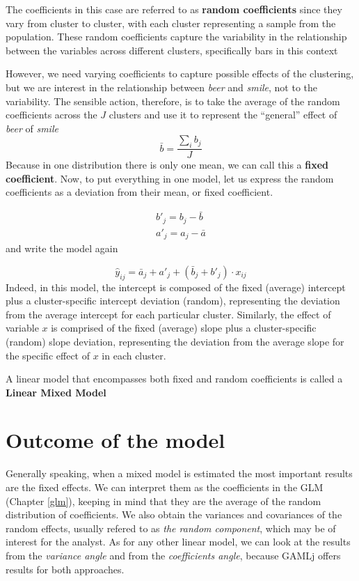 \documentclass[
]{book}
\begin{document}
The coefficients in this case are referred to as \textbf{random coefficients} since they vary from cluster to cluster, with each cluster representing a sample from the population. These random coefficients capture the variability in the relationship between the variables across different clusters, specifically bars in this context

However, we need varying coefficients to capture possible effects of the clustering, but we are interest in the relationship between \emph{beer} and \emph{smile}, not to the variability. The sensible action, therefore, is to take the average of the random coefficients across the \(J\) clusters and use it to represent the ``general'' effect of \emph{beer} of \emph{smile}
\[
\bar{b}=\frac{\sum_i{b_j}}{J} 
\]
Because in one distribution there is only one mean, we can call this a \textbf{fixed coefficient}. Now, to put everything in one model, let us express the random coefficients as a deviation from their mean, or fixed coefficient.

\[
\begin{aligned}
b'_j=b_j-\bar{b}\\ 
a'_j=a_j-\bar{a} 
\end{aligned}
\]
and write the model again

\[ 
\hat{y}_{ij}=\bar{a}_j+a'_j+ (\bar{b}_j+b'_j)  \cdot x_{ij}
\]
Indeed, in this model, the intercept is composed of the fixed (average) intercept plus a cluster-specific intercept deviation (random), representing the deviation from the average intercept for each particular cluster. Similarly, the effect of variable \(x\) is comprised of the fixed (average) slope plus a cluster-specific (random) slope deviation, representing the deviation from the average slope for the specific effect of \(x\) in each cluster.

A linear model that encompasses both fixed and random coefficients is called a \textbf{Linear Mixed Model}

\hypertarget{outcome-of-the-model}{%
\section{Outcome of the model}\label{outcome-of-the-model}}

Generally speaking, when a mixed model is estimated the most important results are the fixed effects. We can interpret them as the coefficients in the GLM (Chapter \ref{glm}), keeping in mind that they are the average of the random distribution of coefficients. We also obtain the variances and covariances of the random effects, usually refered to as \emph{the random component}, which may be of interest for the analyst. As for any other linear model, we can look at the results from the \emph{variance angle} and from the \emph{coefficients angle}, because {GAMLj} offers results for both approaches.
\end{document}
